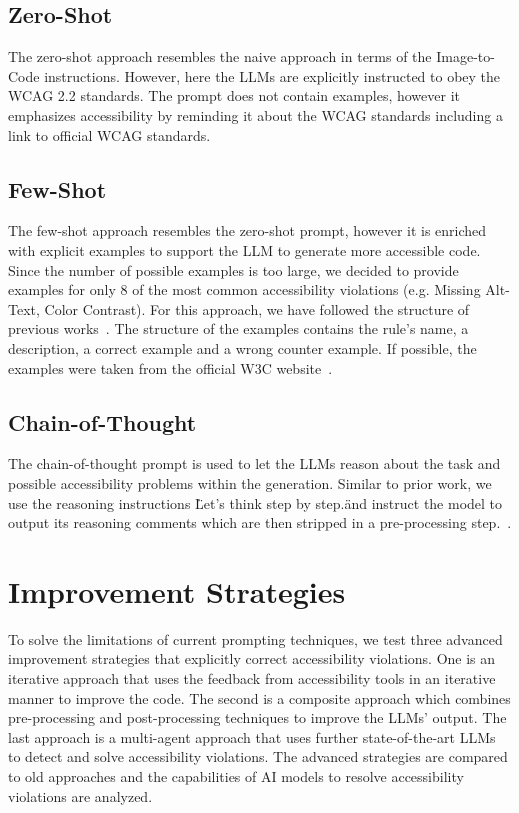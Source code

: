 \subsection{Zero-Shot}
The zero-shot approach resembles the naive approach in terms of the Image-to-Code
instructions. However, here the LLMs are explicitly instructed to obey the WCAG 
2.2 standards. The prompt does not contain examples, however it emphasizes 
accessibility by reminding it about the WCAG standards including a link to 
official WCAG standards.

\subsection{Few-Shot}
The few-shot approach resembles the zero-shot prompt, however it is enriched with 
explicit examples to support the LLM to generate more accessible code. 
Since the number of possible examples is too large, we decided to provide examples 
for only 8 of the most common accessibility violations (e.g. Missing Alt-Text, 
Color Contrast). 
For this approach, we have followed the structure of previous 
works~\parencite{suh2025accessiblecode}.
The structure of the examples contains the rule's name, a description, a
correct example and a wrong counter example. If possible, the examples 
were taken from the official W3C website~\parencite{wcag21}.

\subsection{Chain-of-Thought}
The chain-of-thought prompt is used to let the LLMs reason about the task and possible 
accessibility problems within the generation. Similar to prior work, we use 
the reasoning instructions \"Let’s think step by 
step.\" and instruct the model to output its reasoning comments which 
are then stripped in a pre-processing step.~\parencite{chae2024thinkexecute}.



\section{Improvement Strategies}
To solve the limitations of current prompting techniques, we test three 
advanced improvement strategies that explicitly correct accessibility 
violations. One is an iterative approach that uses the 
feedback from accessibility tools in an iterative manner to improve the code.
The second is a composite approach which combines 
pre-processing and post-processing techniques to improve the LLMs' output.
The last approach is a multi-agent approach that uses further 
state-of-the-art LLMs to detect and solve accessibility violations. \newline
The advanced strategies are compared to old approaches and the capabilities 
of AI models to resolve accessibility violations are analyzed.

